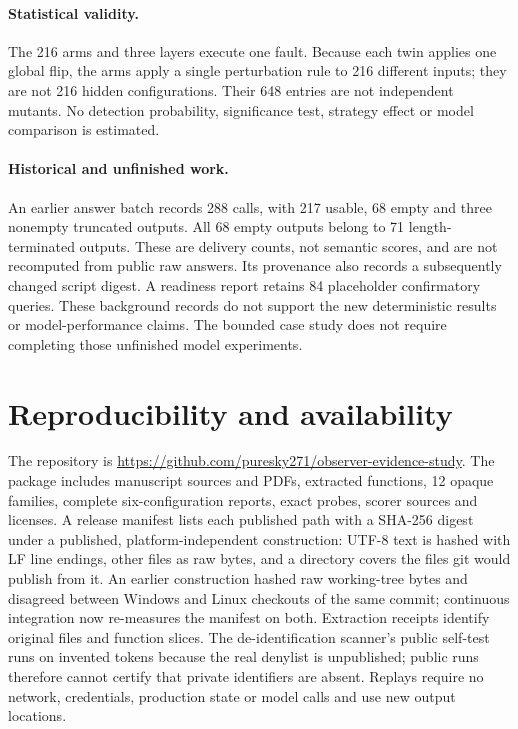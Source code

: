 \documentclass[11pt]{article}
\begin{document}
\paragraph{Statistical validity.}
The 216 arms and three layers execute one fault. Because each twin applies one global flip, the arms apply a single perturbation rule to 216 different inputs; they are not 216 hidden configurations. Their 648 entries are not independent mutants. No detection probability, significance test, strategy effect or model comparison is estimated.

\paragraph{Historical and unfinished work.}
An earlier answer batch records 288 calls, with 217 usable, 68 empty and three nonempty truncated outputs. All 68 empty outputs belong to 71 length-terminated outputs. These are delivery counts, not semantic scores, and are not recomputed from public raw answers. Its provenance also records a subsequently changed script digest. A readiness report retains 84 placeholder confirmatory queries. These background records do not support the new deterministic results or model-performance claims. The bounded case study does not require completing those unfinished model experiments.

\section{Reproducibility and availability}
The repository is \url{https://github.com/puresky271/observer-evidence-study}. The package includes manuscript sources and PDFs, extracted functions, 12 opaque families, complete six-configuration reports, exact probes, scorer sources and licenses. A release manifest lists each published path with a SHA-256 digest under a published, platform-independent construction: UTF-8 text is hashed with LF line endings, other files as raw bytes, and a directory covers the files git would publish from it. An earlier construction hashed raw working-tree bytes and disagreed between Windows and Linux checkouts of the same commit; continuous integration now re-measures the manifest on both. Extraction receipts identify original files and function slices. The de-identification scanner's public self-test runs on invented tokens because the real denylist is unpublished; public runs therefore cannot certify that private identifiers are absent. Replays require no network, credentials, production state or model calls and use new output locations.
\end{document}
